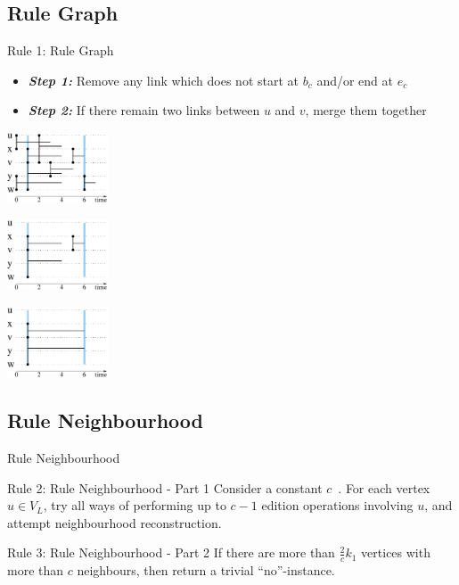 \documentclass{beamer}
\begin{document}
\subsection{Rule Graph}
\begin{frame}
  \begin{block}{Rule 1: Rule Graph}
    \begin{itemize}
    \item \emph{\bfseries Step 1:} Remove any link which does not start at $b_c$ and/or end at $e_c$
    \item \emph{\bfseries Step 2:} If there remain two links between $u$ and $v$, merge them together
    \end{itemize}
  \end{block}
  \begin{table}[!h]
    \begin{minipage}{0.3\linewidth}
      \centering
      \includegraphics[width=30mm]{ex_closest0.pdf}
    \end{minipage}
    \begin{minipage}{0.3\linewidth}
      \centering
      \includegraphics[width=30mm]{ex_closest01.pdf}
    \end{minipage}
    \begin{minipage}{0.3\linewidth}
      \centering
      \includegraphics[width=30mm]{ex_closest1.pdf}
    \end{minipage}
  \end{table}
\end{frame}
\subsection{Rule Neighbourhood}
\begin{frame}{Rule Neighbourhood}
  \begin{block}{Rule 2: Rule Neighbourhood - Part 1}
    Consider a constant $c$~. For each vertex $u\in V_L$, try all ways of performing up to $c-1$ edition operations involving $u$, and attempt neighbourhood reconstruction.
  \end{block}
  \begin{block}{Rule 3: Rule Neighbourhood - Part 2}
    If there are more than $\frac{2}{c}k_1$ vertices with more than $c$ neighbours, then return a trivial ``no''-instance.
  \end{block}
\end{frame}
\end{document}
